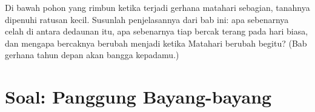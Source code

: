 \begin{exercise}[$\star\star\star$]\label{exo:g6:light-propagation:12}
Di bawah pohon yang rimbun ketika terjadi gerhana matahari sebagian,
tanahnya dipenuhi ratusan  kecil. Susunlah penjelasannya dari bab
ini: apa sebenarnya celah di antara dedaunan itu, apa sebenarnya tiap
bercak terang pada hari biasa, dan mengapa bercaknya berubah menjadi
 ketika Matahari berubah begitu? (Bab gerhana tahun depan akan
bangga kepadamu.)
\end{exercise}

\section{Soal: Panggung Bayang-bayang}

